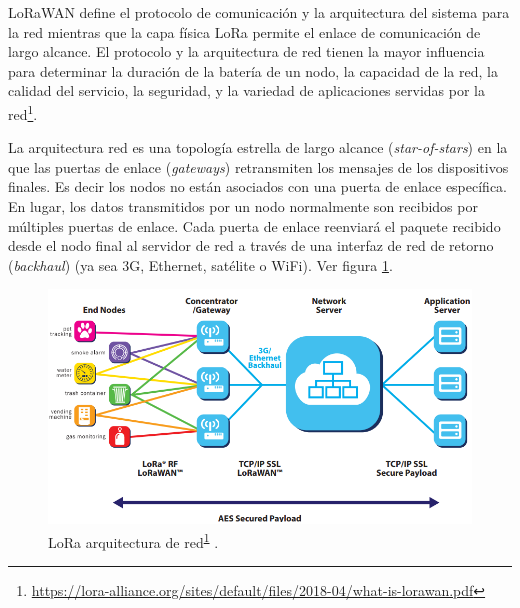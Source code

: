 
LoRaWAN define el protocolo de comunicación y la arquitectura del sistema para la red mientras que la capa física LoRa permite el enlace de comunicación de largo alcance.
El protocolo y la arquitectura de red tienen la mayor influencia para determinar la duración de la batería de un nodo, la capacidad de la red, la calidad del servicio, la seguridad, y la variedad de aplicaciones servidas por la red\protect\footnote{\label{note1}\url{https://lora-alliance.org/sites/default/files/2018-04/what-is-lorawan.pdf}}. 


La arquitectura red es una topología estrella de largo alcance (\textit{star-of-stars}) en la que las puertas de enlace (\textit{gateways}) retransmiten los mensajes de los dispositivos finales. Es decir los nodos no están asociados con una puerta de enlace específica. En lugar, los datos transmitidos por un nodo normalmente son recibidos por múltiples puertas de enlace. Cada puerta de enlace reenviará el paquete recibido desde el nodo final al servidor de red a través de una interfaz de red de retorno (\textit{backhaul}) (ya sea 3G, Ethernet, satélite o WiFi). Ver figura \ref{fig:Loraarquitecturenetwork}.

\begin{figure}[h]
	\centering
	\includegraphics[scale=.65]{./Figures/Loraarquitecturenetwork.PNG}
	\caption{LoRa arquitectura de red\textsuperscript{\ref{note1}} \citep{LoRaAlliance2015}.}
	\label{fig:Loraarquitecturenetwork}
\end{figure}



